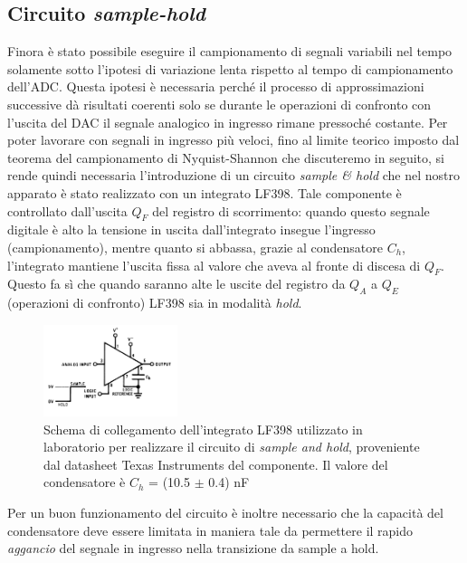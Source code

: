 \documentclass[journal]{IEEEtran}
\begin{document}
\subsection{Circuito \textit{sample-hold}}
Finora è stato possibile eseguire il campionamento di segnali variabili nel tempo solamente sotto l'ipotesi di variazione lenta rispetto al tempo di campionamento dell'ADC. Questa ipotesi è necessaria perché il processo di approssimazioni successive dà risultati coerenti solo se durante le operazioni di confronto con l'uscita del DAC il segnale analogico in ingresso rimane pressoché costante. Per poter lavorare con segnali in ingresso più veloci, fino al limite teorico imposto dal teorema del campionamento di Nyquist-Shannon che discuteremo in seguito, si rende quindi necessaria l'introduzione di un circuito \textit{sample \& hold} che nel nostro apparato è stato realizzato con un integrato LF398. Tale componente è controllato dall'uscita $Q_F$ del registro di scorrimento: quando questo segnale digitale è alto la tensione in uscita dall'integrato insegue l'ingresso (campionamento), mentre quanto si abbassa, grazie al condensatore $C_h$, l'integrato mantiene l'uscita fissa al valore che aveva al fronte di discesa di $Q_F$. Questo fa sì che quando saranno alte le uscite del registro da $Q_A$ a $Q_E$ (operazioni di confronto) LF398 sia in modalità \textit{hold}.


\begin{figure}[H]%
\begin{center}
\includegraphics[width=0.35\textwidth]{sch-simulations/digital/output/lf398.png}
\caption{Schema di collegamento dell'integrato LF398 utilizzato in laboratorio per realizzare il circuito di \textit{sample and hold}, proveniente dal datasheet Texas Instruments del componente. Il valore del condensatore è $C_h$ = (10.5 $\pm$ 0.4) nF}
\label{fig:circuit_sample_and_hold}
\end{center}
\end{figure}
Per un buon funzionamento del circuito è inoltre necessario che la capacità del condensatore deve essere limitata in maniera tale da permettere il rapido \textit{aggancio} del segnale in ingresso nella transizione da sample a hold.
\end{document}
